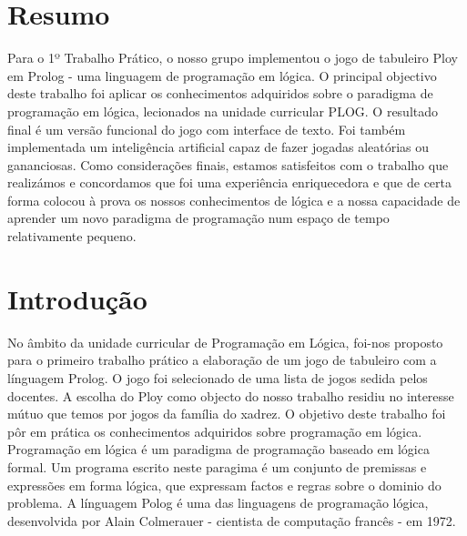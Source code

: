 \documentclass[a4paper]{article}
\begin{document}

\newpage

\section*{Resumo}
Para o 1º Trabalho Prático, o nosso grupo implementou o jogo de tabuleiro Ploy em Prolog - uma linguagem de programação em lógica.
O principal objectivo deste trabalho foi aplicar os conhecimentos adquiridos sobre o paradigma de programação em lógica, lecionados na unidade curricular PLOG.
O resultado final é um versão funcional do jogo com interface de texto. Foi também implementada um inteligência artificial capaz de fazer jogadas aleatórias ou gananciosas.
Como considerações finais, estamos satisfeitos com o trabalho que realizámos e concordamos que foi uma experiência enriquecedora e que de certa forma colocou à prova os nossos conhecimentos de lógica e a nossa capacidade de aprender um novo paradigma de programação num espaço de tempo relativamente pequeno.


\newpage

\tableofcontents



\newpage

\section{Introdução}
No âmbito da unidade curricular de Programação em Lógica, foi-nos proposto para o primeiro trabalho prático a elaboração de um jogo de tabuleiro com a línguagem Prolog. O jogo foi selecionado de uma lista de jogos sedida pelos docentes. A escolha do Ploy como objecto do nosso trabalho residiu no interesse mútuo que temos por jogos da família do xadrez.
O objetivo deste trabalho foi pôr em prática os conhecimentos adquiridos sobre programação em lógica. Programação em lógica é um paradigma de programação baseado em lógica formal. Um programa escrito neste paragima é um conjunto de premissas e expressões em forma lógica, que expressam factos e regras sobre o dominio do problema. A línguagem Polog é uma das linguagens de programação lógica, desenvolvida por Alain Colmerauer - cientista de computação francês - em 1972.
\end{document}

